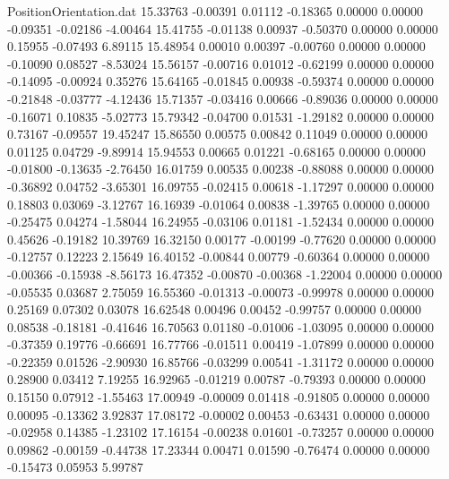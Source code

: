 \begin{filecontents}{PositionOrientation.dat}
  15.33763   -0.00391    0.01112    -0.18365    0.00000    0.00000   -0.09351   -0.02186   -4.00464
  15.41755   -0.01138    0.00937    -0.50370    0.00000    0.00000    0.15955   -0.07493    6.89115
  15.48954    0.00010    0.00397    -0.00760    0.00000    0.00000   -0.10090    0.08527   -8.53024
  15.56157   -0.00716    0.01012    -0.62199    0.00000    0.00000   -0.14095   -0.00924    0.35276
  15.64165   -0.01845    0.00938    -0.59374    0.00000    0.00000   -0.21848   -0.03777   -4.12436
  15.71357   -0.03416    0.00666    -0.89036    0.00000    0.00000   -0.16071    0.10835   -5.02773
  15.79342   -0.04700    0.01531    -1.29182    0.00000    0.00000    0.73167   -0.09557   19.45247
  15.86550    0.00575    0.00842     0.11049    0.00000    0.00000    0.01125    0.04729   -9.89914
  15.94553    0.00665    0.01221    -0.68165    0.00000    0.00000   -0.01800   -0.13635   -2.76450
  16.01759    0.00535    0.00238    -0.88088    0.00000    0.00000   -0.36892    0.04752   -3.65301
  16.09755   -0.02415    0.00618    -1.17297    0.00000    0.00000    0.18803    0.03069   -3.12767
  16.16939   -0.01064    0.00838    -1.39765    0.00000    0.00000   -0.25475    0.04274   -1.58044
  16.24955   -0.03106    0.01181    -1.52434    0.00000    0.00000    0.45626   -0.19182   10.39769
  16.32150    0.00177   -0.00199    -0.77620    0.00000    0.00000   -0.12757    0.12223    2.15649
  16.40152   -0.00844    0.00779    -0.60364    0.00000    0.00000   -0.00366   -0.15938   -8.56173
  16.47352   -0.00870   -0.00368    -1.22004    0.00000    0.00000   -0.05535    0.03687    2.75059
  16.55360   -0.01313   -0.00073    -0.99978    0.00000    0.00000    0.25169    0.07302    0.03078
  16.62548    0.00496    0.00452    -0.99757    0.00000    0.00000    0.08538   -0.18181   -0.41646
  16.70563    0.01180   -0.01006    -1.03095    0.00000    0.00000   -0.37359    0.19776   -0.66691
  16.77766   -0.01511    0.00419    -1.07899    0.00000    0.00000   -0.22359    0.01526   -2.90930
  16.85766   -0.03299    0.00541    -1.31172    0.00000    0.00000    0.28900    0.03412    7.19255
  16.92965   -0.01219    0.00787    -0.79393    0.00000    0.00000    0.15150    0.07912   -1.55463
  17.00949   -0.00009    0.01418    -0.91805    0.00000    0.00000    0.00095   -0.13362    3.92837
  17.08172   -0.00002    0.00453    -0.63431    0.00000    0.00000   -0.02958    0.14385   -1.23102
  17.16154   -0.00238    0.01601    -0.73257    0.00000    0.00000    0.09862   -0.00159   -0.44738
  17.23344    0.00471    0.01590    -0.76474    0.00000    0.00000   -0.15473    0.05953    5.99787

\end{filecontents}
